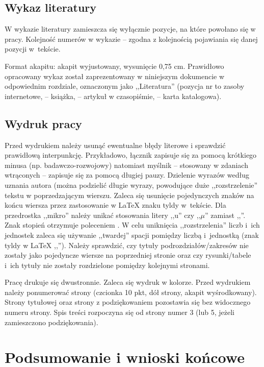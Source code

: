 \documentclass[12pt,twoside]{article}
\begin{document}
\subsection{Wykaz literatury}

W wykazie literatury zamieszcza się wyłącznie pozycje, na które powołano się
w pracy. Kolejność numerów w wykazie -- zgodna z kolejnością pojawiania się danej
pozycji w~tekście.

Format akapitu: akapit wyjustowany, wysunięcie 0,75 cm. Prawidłowo opracowany
wykaz został zaprezentowany w niniejszym dokumencie w odpowiednim rozdziale, oznaczonym jako ,,Literatura''  (pozycja nr \cite{str} to zasoby internetowe,
\cite{Jakubczyk1997} -- książka, \cite{Barski2011} -- artykuł w czasopiśmie, \cite{dokum} -- karta katalogowa).

\subsection{Wydruk pracy}

Przed wydrukiem należy usunąć ewentualne błędy literowe i sprawdzić prawidłową
interpunkcję.
Przykładowo, łącznik zapisuje się za pomocą krótkiego minusa (np.
badaw\-czo-rozwojowy) natomiast myślnik -- stosowany w zdaniach wtrąconych -- zapisuje
się za pomocą długiej pauzy.
Dzielenie wyrazów według uznania autora (można podzielić
długie wyrazy, powodujące duże ,,rozstrzelenie'' tekstu w poprzedzającym wierszu.
Zaleca się usunięcie pojedynczych znaków na końcu wiersza przez zastosowanie w \LaTeX{} znaku tyldy w~tekście.
Dla przedrostka ,,mikro'' należy unikać stosowania litery ,,u'' czy ,,$\mu$'' zamiast ,,\microS''. 
Znak stopień otrzymuje poleceniem .
W celu uniknięcia ,,rozstrzelenia'' liczb i~ich jednostek zaleca się używanie ,,twardej'' spacji pomiędzy liczbą i~jednostką (znak tyldy w \LaTeX{} ,,'').
Należy sprawdzić, czy tytuły
podrozdziałów/zakresów nie zostały jako pojedyncze wiersze na poprzedniej stronie oraz
czy rysunki/tabele i~ich tytuły nie zostały rozdzielone pomiędzy kolejnymi stronami.

Pracę drukuje się dwustronnie. Zaleca się wydruk w kolorze. Przed wydrukiem
należy ponumerować strony (czcionka 10 pkt, dół strony, akapit wyśrodkowany).
Strony tytułowej oraz strony z podziękowaniem pozostawia się bez widocznego numeru strony.
Spis treści rozpoczyna się od strony numer 3 (lub 5, jeżeli zamieszczono podziękowania).


\section{Podsumowanie i wnioski końcowe}
\end{document}
